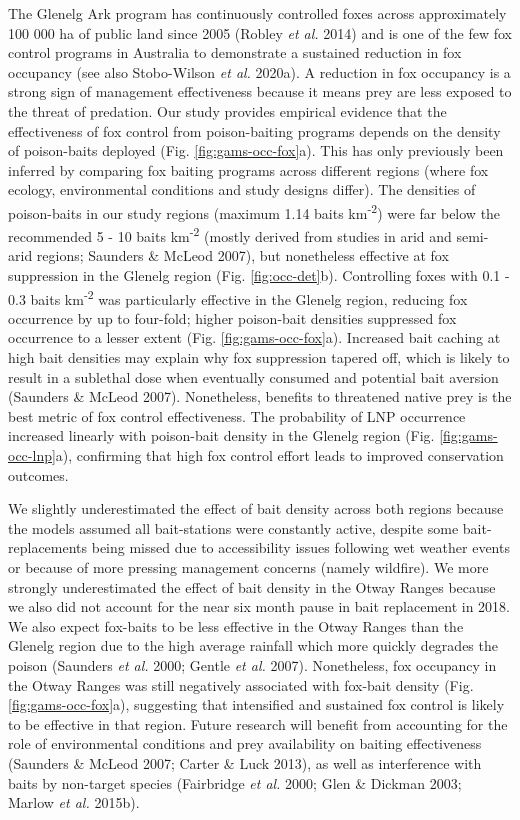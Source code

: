 \documentclass[11pt,a4paper,titlepage,twoside,openright]{style/unimelbthesis}
\begin{document}
\begin{mainmatter}
The Glenelg Ark program has continuously controlled foxes across approximately 100 000 ha of public land since 2005 (Robley \emph{et al.} 2014) and is one of the few fox control programs in Australia to demonstrate a sustained reduction in fox occupancy (see also Stobo-Wilson \emph{et al.} 2020a). A reduction in fox occupancy is a strong sign of management effectiveness because it means prey are less exposed to the threat of predation. Our study provides empirical evidence that the effectiveness of fox control from poison-baiting programs depends on the density of poison-baits deployed (Fig. \ref{fig:gams-occ-fox}a). This has only previously been inferred by comparing fox baiting programs across different regions (where fox ecology, environmental conditions and study designs differ). The densities of poison-baits in our study regions (maximum 1.14 baits km\textsuperscript{-2}) were far below the recommended 5 - 10 baits km\textsuperscript{-2} (mostly derived from studies in arid and semi-arid regions; Saunders \& McLeod 2007), but nonetheless effective at fox suppression in the Glenelg region (Fig. \ref{fig:occ-det}b). Controlling foxes with 0.1 - 0.3 baits km\textsuperscript{-2} was particularly effective in the Glenelg region, reducing fox occurrence by up to four-fold; higher poison-bait densities suppressed fox occurrence to a lesser extent (Fig. \ref{fig:gams-occ-fox}a). Increased bait caching at high bait densities may explain why fox suppression tapered off, which is likely to result in a sublethal dose when eventually consumed and potential bait aversion (Saunders \& McLeod 2007). Nonetheless, benefits to threatened native prey is the best metric of fox control effectiveness. The probability of LNP occurrence increased linearly with poison-bait density in the Glenelg region (Fig. \ref{fig:gams-occ-lnp}a), confirming that high fox control effort leads to improved conservation outcomes.

We slightly underestimated the effect of bait density across both regions because the models assumed all bait-stations were constantly active, despite some bait-replacements being missed due to accessibility issues following wet weather events or because of more pressing management concerns (namely wildfire). We more strongly underestimated the effect of bait density in the Otway Ranges because we also did not account for the near six month pause in bait replacement in 2018. We also expect fox-baits to be less effective in the Otway Ranges than the Glenelg region due to the high average rainfall which more quickly degrades the poison (Saunders \emph{et al.} 2000; Gentle \emph{et al.} 2007). Nonetheless, fox occupancy in the Otway Ranges was still negatively associated with fox-bait density (Fig. \ref{fig:gams-occ-fox}a), suggesting that intensified and sustained fox control is likely to be effective in that region. Future research will benefit from accounting for the role of environmental conditions and prey availability on baiting effectiveness (Saunders \& McLeod 2007; Carter \& Luck 2013), as well as interference with baits by non-target species (Fairbridge \emph{et al.} 2000; Glen \& Dickman 2003; Marlow \emph{et al.} 2015b).


\end{mainmatter}
\end{document}
